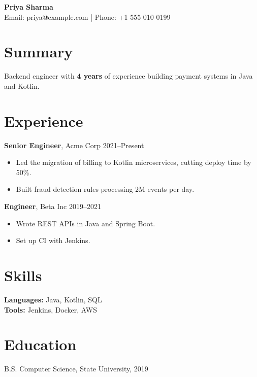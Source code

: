 \documentclass[11pt]{article}
\begin{document}
\begin{center}
{\LARGE \textbf{Priya Sharma}}\\
Email: priya@example.com | Phone: +1 555 010 0199
\end{center}

\section*{Summary}
Backend engineer with \textbf{4 years} of experience building payment systems in Java and Kotlin.

\section*{Experience}
\textbf{Senior Engineer}, Acme Corp \hfill 2021--Present
\begin{itemize}
  \item Led the migration of billing to Kotlin microservices, cutting deploy time by 50\%.
  \item Built fraud-detection rules processing 2M events per day.
\end{itemize}
\textbf{Engineer}, Beta Inc \hfill 2019--2021
\begin{itemize}
  \item Wrote REST APIs in Java and Spring Boot.
  \item Set up CI with Jenkins. %
\end{itemize}

\section*{Skills}
\textbf{Languages:} Java, Kotlin, SQL \\
\textbf{Tools:} Jenkins, Docker, AWS

\section*{Education}
B.S. Computer Science, State University, 2019
\end{document}
